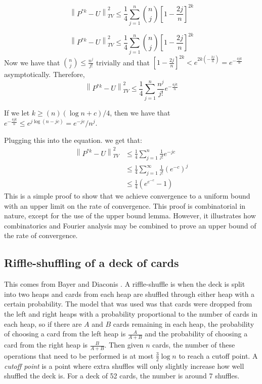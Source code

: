 \documentclass[]{article}
\theoremstyle{definition}
\numberwithin{theorem}{section}
\numberwithin{equation}{section}
\begin{document}
\begin{equation}
	\left\| P^{\ast k} - U \right\|_{TV}^2 \leq \frac{1}{4} \sum_{j = 1}^{n}\binom{n}{j} \left[1 - \frac{2j}{n}\right]^{2k}
\end{equation}

\begin{equation}
	\left\| P^{\ast k} - U \right\|_{TV}^2 \leq \frac{1}{4} \sum_{j = 1}^{n}\binom{n}{j} \left[1 - \frac{2j}{n}\right]^{2k}
\end{equation}
Now we have that $\binom{n}{j} \leq \frac{n^j}{j!}$ trivially and that $\left[1 - \frac{2j}{n}\right]^{2k} < e^{2k(- \frac{2j}{n})} = e^{-\frac{4jk}{n}}$ asymptotically. 
Therefore, 
\begin{equation}
	\left\| P^{\ast k} - U \right\|_{TV}^2 \leq \frac{1}{4} \sum_{j = 1}^{n}\frac{n^j}{j!} e^{-\frac{4jk}{n}}
\end{equation}

If we let $k \geq (n)(\log n + c)/4$, then we have that $e^{-\frac{4jk}{n}} \leq e^{j \log (n - jc)}= e^{- j c}/ n^j$.

Plugging this into the equation. we get that:
\begin{align*}
	\left\| P^{\ast k} - U \right\|_{TV}^2 &\leq \frac{1}{4} \sum_{j = 1}^{n}\frac{1}{j!}e^{-jc}\\	
	&\leq \frac{1}{4}\sum_{j = 1}^{\infty}\frac{1}{j!}\left(e^{-c}\right)^j\\
	&\leq \frac{1}{4}\left(e^{e^{-c}} - 1\right)
\end{align*}
This is a simple proof to show that we achieve convergence to a uniform bound with an upper limit on the rate of convergence. This proof is combinatorial in nature, except for the use of the upper bound lemma. However, it illustrates how combinatorics and Fourier analysis may be combined to prove an upper bound of the rate of convergence.

	\subsection{Riffle-shuffling of a deck of cards}This comes from Bayer and Diaconis \cite{bayerTrailingDovetailShuffle1992}. A riffle-shuffle is when the deck is split into two heaps and cards from each heap are shuffled through either heap with a certain probability. The model that was used was that cards were dropped from the left and right heaps with a probability proportional to the number of cards in each heap, so if there are $A$ and $B$ cards remaining in each heap, the probability of choosing a card from the left heap is $\frac{A}{A + B}$ and the probability of choosing a card from the right heap is $\frac{B}{A + B}$. Then given $n$ cards, the number of these operations that need to be performed is at most $\frac{3}{2} \log n$ to reach a cutoff point. A \textit{cutoff point} is a point where extra shuffles will only slightly increase how well shuffled the deck is. For a deck of 52 cards, the number is around 7 shuffles. 
\end{document}
